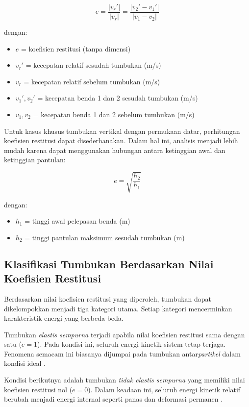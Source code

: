 \begin{equation}
    e = \frac{|v_{r}'|}{|v_{r}|} = \frac{|v_2' - v_1'|}{|v_1 - v_2|}
\end{equation}

dengan:
\begin{itemize}
    \item $e$ = koefisien restitusi (tanpa dimensi)
    \item $v_{r}'$ = kecepatan relatif sesudah tumbukan (m/s)
    \item $v_{r}$ = kecepatan relatif sebelum tumbukan (m/s)
    \item $v_1', v_2'$ = kecepatan benda 1 dan 2 sesudah tumbukan (m/s)
    \item $v_1, v_2$ = kecepatan benda 1 dan 2 sebelum tumbukan (m/s)
\end{itemize}

Untuk kasus khusus tumbukan vertikal dengan permukaan datar, perhitungan koefisien restitusi dapat disederhanakan. Dalam hal ini, analisis menjadi lebih mudah karena dapat menggunakan hubungan antara ketinggian awal dan ketinggian pantulan:

\begin{equation}
    e = \sqrt{\frac{h_2}{h_1}}
\end{equation}

dengan:
\begin{itemize}
    \item $h_1$ = tinggi awal pelepasan benda (m)
    \item $h_2$ = tinggi pantulan maksimum sesudah tumbukan (m)
\end{itemize}

\subsection{Klasifikasi Tumbukan Berdasarkan Nilai Koefisien Restitusi}
Berdasarkan nilai koefisien restitusi yang diperoleh, tumbukan dapat dikelompokkan menjadi tiga kategori utama. Setiap kategori mencerminkan karakteristik energi yang berbeda-beda.

Tumbukan \textit{elastis sempurna} terjadi apabila nilai koefisien restitusi sama dengan satu ($e = 1$). Pada kondisi ini, seluruh energi kinetik sistem tetap terjaga. Fenomena semacam ini biasanya dijumpai pada tumbukan antar\textit{partikel} dalam kondisi ideal \citep{stronge2018impact}. 

Kondisi berikutnya adalah tumbukan \textit{tidak elastis sempurna} yang memiliki nilai koefisien restitusi nol ($e = 0$). Dalam keadaan ini, seluruh energi kinetik relatif berubah menjadi energi internal seperti panas dan deformasi permanen \citep{johnson1987contact}. 

